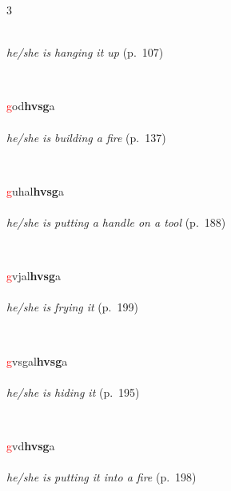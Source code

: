 \documentclass[oneside,openany]{book}%
\begin{document}
\begin{multicols}{3}
\begin{minipage}[t]{\linewidth}
\\
\noindent \textit{he/she is hanging it up} (p.~107)
\end{minipage}\\[1em]%
\begin{minipage}[t]{\linewidth}
\raggedright\noindent \textcolor{Red}{g}od\textbf{hvsg}a\\
\\
\noindent \textit{he/she is building a fire} (p.~137)
\end{minipage}\\[1em]%
\begin{minipage}[t]{\linewidth}
\raggedright\noindent \textcolor{Red}{g}uhal\textbf{hvsg}a\\
\\
\noindent \textit{he/she is putting a handle on a tool} (p.~188)
\end{minipage}\\[1em]%
\begin{minipage}[t]{\linewidth}
\raggedright\noindent \textcolor{Red}{g}vjal\textbf{hvsg}a\\
\\
\noindent \textit{he/she is frying it} (p.~199)
\end{minipage}\\[1em]%
\begin{minipage}[t]{\linewidth}
\raggedright\noindent \textcolor{Red}{g}vsgal\textbf{hvsg}a\\
\\
\noindent \textit{he/she is hiding it} (p.~195)
\end{minipage}\\[1em]%
\begin{minipage}[t]{\linewidth}
\raggedright\noindent \textcolor{Red}{g}vd\textbf{hvsg}a\\
\\
\noindent \textit{he/she is putting it into a fire} (p.~198)
\end{minipage}\\[1em]%
\begin{minipage}[t]{\linewidth}

\end{minipage}
\end{multicols}
\end{document}
